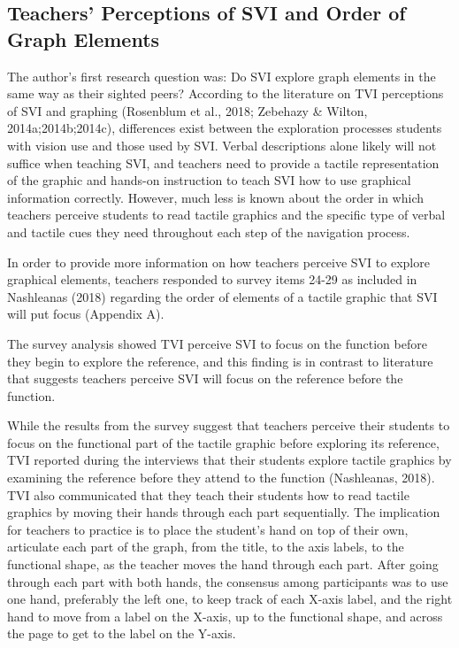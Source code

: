 \documentclass[11.5pt]{sig-alternate} %
\begin{document}
\begin{large}
\subsection*{Teachers’ Perceptions of SVI and Order of Graph Elements}

The author’s first research question was: Do SVI explore graph elements in the same way as their sighted peers? According to the literature on TVI perceptions of SVI and graphing (Rosenblum et al., 2018; Zebehazy \& Wilton, 2014a;2014b;2014c), differences exist between the exploration processes students with vision use and those used by SVI. Verbal descriptions alone likely will not suffice when teaching SVI, and teachers need to provide a tactile representation of the graphic and hands-on instruction to teach SVI how to use graphical information correctly. However, much less is known about the order in which teachers perceive students to read tactile graphics and the specific type of verbal and tactile cues they need throughout each step of the navigation process.
 
In order to provide more information on how teachers perceive SVI to explore graphical elements, teachers responded to survey items 24-29 as included in Nashleanas (2018) regarding the order of elements of a tactile graphic that SVI will put focus (Appendix A). 
 
The survey analysis showed TVI perceive SVI to focus on the function before they begin to explore the reference, and this finding is in contrast to literature that suggests teachers perceive SVI will focus on the reference before the function.
 
While the results from the survey suggest that teachers perceive their students to focus on the functional part of the tactile graphic before exploring its reference, TVI reported during the interviews that their students explore tactile graphics by examining the reference before they attend to the function (Nashleanas, 2018). TVI also communicated that they teach their students how to read tactile graphics by moving their hands through each part sequentially. The implication for teachers to practice is to place the student's hand on top of their own, articulate each part of the graph, from the title, to the axis labels, to the functional shape, as the teacher moves the hand through each part. After going through each part with both hands, the consensus among participants was to use one hand, preferably the left one, to keep track of each X-axis label, and the right hand to move from a label on the X-axis, up to the functional shape, and across the page to get to the label on the Y-axis.
 

\end{large}
\end{document}
